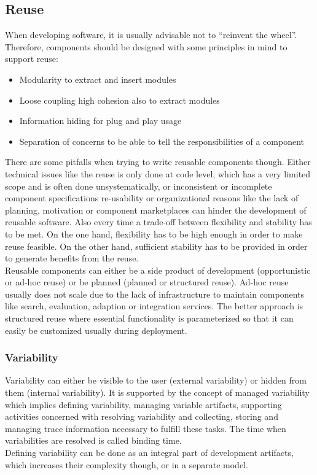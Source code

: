 \subsection{Reuse}
When developing software, it is usually advisable not to ``reinvent the wheel''.
Therefore, components should be designed with some principles in mind to support reuse:
\begin{itemize}
  \item Modularity to extract and insert modules
  \item Loose coupling high cohesion also to extract modules
  \item Information hiding for plug and play usage
  \item Separation of concerns to be able to tell the responsibilities of a component
\end{itemize}
There are some pitfalls when trying to write reusable components though.
Either technical issues like the reuse is only done at code level, which has a very limited scope and is often done unsystematically, or inconsistent or incomplete component specifications re-usability or organizational reasons like the lack of planning, motivation or component marketplaces can hinder the development of reusable software.
Also every time a trade-off between flexibility and stability has to be met.
On the one hand, flexibility has to be high enough in order to make reuse feasible.
On the other hand, sufficient stability has to be provided in order to generate benefits from the reuse.\\
Reusable components can either be a side product of development (opportunistic or ad-hoc reuse) or be planned (planned or structured reuse).
Ad-hoc reuse usually does not scale due to the lack of infrastructure to maintain components like search, evaluation, adaption or integration services.
The better approach is structured reuse where essential functionality is parameterized so that it can easily be customized usually during deployment.

\subsubsection{Variability}
Variability can either be visible to the user (external variability) or hidden from them (internal variability).
It is supported by the concept of managed variability which implies defining variability, managing variable artifacts, supporting activities concerned with resolving variability and collecting, storing and managing trace information necessary to fulfill these tasks.
The time when variabilities are resolved is called binding time.\\
Defining variability can be done as an integral part of development artifacts, which increases their complexity though, or in a separate model.

